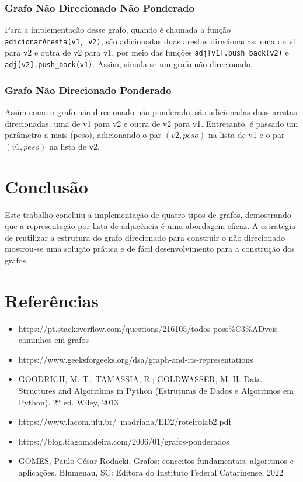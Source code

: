 \documentclass[12pt]{article}
\begin{document}
\subsubsection{Grafo Não Direcionado Não Ponderado}
Para a implementação desse grafo, quando é chamada a função 
\texttt{adicionarAresta(v1, v2)}, são adicionadas duas arestas direcionadas: uma de v1 para 
v2 e outra de v2 para v1, por meio das funções \texttt{adj[v1].push\_back(v2)} e 
\texttt{adj[v2].push\_back(v1)}. Assim, simula-se um grafo não direcionado.

\subsubsection{Grafo Não Direcionado Ponderado}
Assim como o grafo não direcionado não ponderado, são adicionadas duas arestas 
direcionadas, uma de v1 para v2 e outra de v2 para v1. Entretanto, é passado 
um parâmetro a mais (peso), adicionando o par $(v2, peso)$ na lista de v1 e o par $(v1, peso)$ 
na lista de v2.  

\section{Conclusão}
Este trabalho concluiu a implementação de quatro tipos de grafos, demostrando que a 
representação por lista de adjacência é uma abordagem eficaz. A estratégia de reutilizar a estrutura 
do grafo direcionado para construir o não direcionado mostrou-se uma solução prática e de fácil 
desenvolvimento para a construção dos grafos.

\section*{Referências}

\begin{itemize}
    \item https://pt.stackoverflow.com/questions/216105/todos-poss\%C3\%ADveis-caminhos-em-grafos
    \item https://www.geeksforgeeks.org/dsa/graph-and-its-representations
    \item GOODRICH, M. T.; TAMASSIA, R.; GOLDWASSER, M. H. Data Structures and Algorithms in Python (Estruturas de Dados e Algoritmos em Python). 2ª ed. Wiley, 2013
    \item https://www.facom.ufu.br/~madriana/ED2/roteirolab2.pdf
    \item https://blog.tiagomadeira.com/2006/01/grafos-ponderados
    \item GOMES, Paulo César Rodacki. Grafos: conceitos fundamentais, algoritmos e aplicações. Blumenau, SC: Editora do Instituto Federal Catarinense, 2022
\end{itemize}
\end{document}
